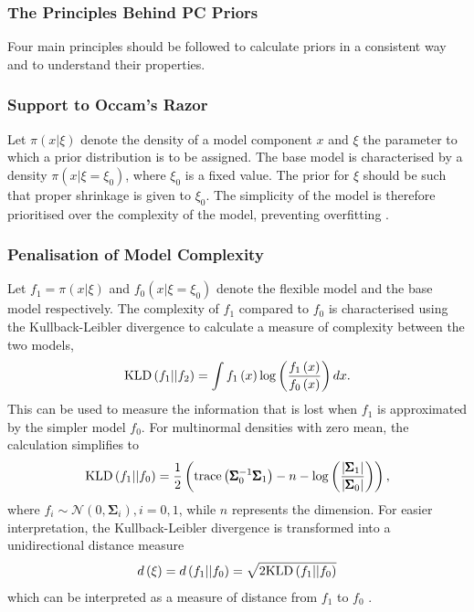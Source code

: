 \subsubsection{The Principles Behind PC Priors}
Four main principles should be followed to calculate priors in a consistent way and to understand their properties.
\subsubsection*{Support to Occam's Razor} 
Let $\pi\left(x|\xi\right)$ denote the density of a model component $x$ and $\xi$ the parameter to which a prior distribution is to be assigned. The base model is characterised by a density $\pi\left(x|\xi=\xi_0\right)$, where $\xi_0$ is a fixed value. The prior for $\xi$ should be such that proper shrinkage is given to $\xi_0$. The simplicity of the model is therefore prioritised over the complexity of the model, preventing overfitting \autocite[][]{martins2014penalising}.
\subsubsection*{Penalisation of Model Complexity} 
Let $f_1=\pi\left(x|\xi\right)$ and $f_0\left(x|\xi=\xi_0\right)$ denote the flexible model and the base model respectively. The complexity of $f_1$ compared to $f_0$ is characterised using the Kullback-Leibler divergence \autocite[][]{kullback1951information} to calculate a measure of complexity between the two models,
\begin{equation}
    \hbox{KLD}\left(f_1||f_2\right) = \int f_1\left(x\right)\log\left(\frac{f_1\left(x\right)}{f_0\left(x\right)}\right)dx.
\end{equation}
This can be used to measure the information that is lost when $f_1$ is approximated by the simpler model $f_0$. For multinormal densities with zero mean, the calculation simplifies to
\begin{equation}
    \hbox{KLD}\left(f_1||f_0\right) = \frac{1}{2}\left(\hbox{trace}\left(\pmb{\Sigma}_0^{-1}\pmb{\Sigma}_1\right)-n-\log\left(\frac{\left|\pmb{\Sigma}_1\right|}{\left|\pmb{\Sigma}_0\right|}\right)\right),
\end{equation}
where $f_i\sim\mathcal{N}\left(0,\pmb{\Sigma}_i\right), i=0,1$, while $n$ represents the dimension. For easier interpretation, the Kullback-Leibler divergence is transformed into a unidirectional distance measure
\begin{equation}
    d\left(\xi\right) = d\left(f_1||f_0\right)=\sqrt{2\hbox{KLD}\left(f_1||f_0\right)}
\end{equation}
which can be interpreted as a measure of distance from $f_1$ to $f_0$ \autocite[][]{martins2014penalising}.
